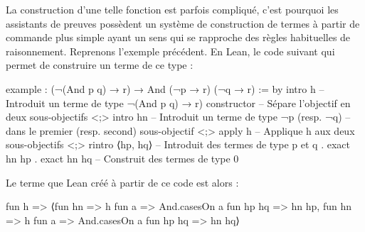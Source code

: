 \documentclass[../../rapport.tex]{subfiles}
\begin{document}
  La construction d'une telle fonction est parfois compliqué, c'est pourquoi les assistants de preuves possèdent
  un système de construction de termes à partir de commande plus simple ayant un sens qui se rapproche des règles habituelles
  de raisonnement.
  Reprenons l'exemple précédent. En Lean, le code suivant qui permet de construire un terme de ce type :
  \begin{lean4code}
    example : (¬(And p q) → r) → And (¬p → r) (¬q → r) := by
      intro h 	    -- Introduit un terme de type ¬(And p q) → r)
      constructor 	-- Sépare l'objectif en deux sous-objectifs
      <;> intro hn        -- Introduit un terme de type ¬p (resp. ¬q)
		          -- dans le premier (resp. second) sous-objectif
      <;> apply h 	-- Applique h aux deux sous-objectifs
      <;> rintro ⟨hp, hq⟩ -- Introduit des termes de type p et q
      . exact hn hp
      . exact hn hq       -- Construit des termes de type 0
  \end{lean4code}
  Le terme que Lean créé à partir de ce code est alors :
  \begin{lean4code}
    fun h =>
      ⟨fun hn => h fun a => And.casesOn a fun hp hq => hn hp,
       fun hn => h fun a => And.casesOn a fun hp hq => hn hq⟩
  \end{lean4code}
\end{document}
